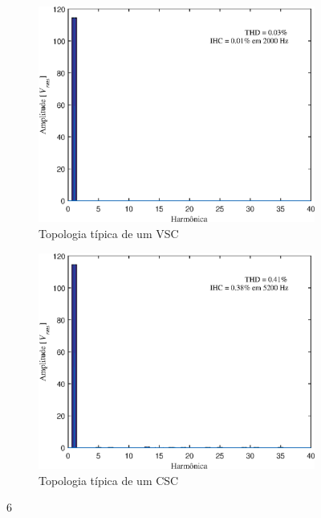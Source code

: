 \begin{figure}[!htb] %
	\centering
	\begin{subfigure}[b]{0.48\textwidth}
		\centering
		\includegraphics[width=\textwidth]{Cap4/Figuras/resultados_unfilt_6.eps}
		\caption{Topologia típica de um VSC} 
		\label{fig:resultados_unfilt_6.eps}
	\end{subfigure}%
		\hfill
	\begin{subfigure}[b]{0.48\textwidth}  
		\centering 
		\includegraphics[width=\textwidth]{Cap4/Figuras/resultados_filt_6.eps}
		\caption{Topologia típica de um CSC}    
		\label{fig:resultados_filt_6.eps}
	\end{subfigure}%
	\caption{6}
	\label{fig:6}
\end{figure}

